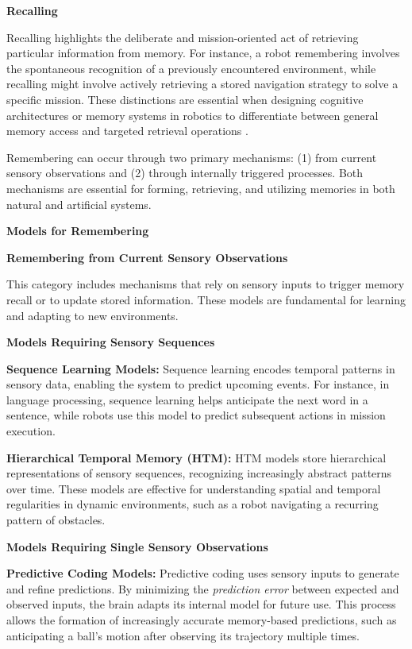 \documentclass{book}
\providecommand{\ProjectDeepHeading}[2]{%
    \par\medskip\noindent\textbf{#2}\par\smallskip
}
\begin{document}
    \ProjectDeepHeading{9}{Recalling}
     Recalling highlights the deliberate and mission-oriented act of retrieving particular information from memory. For instance, a robot remembering involves the spontaneous recognition of a previously encountered environment, while recalling might involve actively retrieving a stored navigation strategy to solve a specific mission. These distinctions are essential when designing cognitive architectures or memory systems in robotics to differentiate between general memory access and targeted retrieval operations .

    Remembering can occur through two primary mechanisms: (1) from current sensory observations and (2) through internally triggered processes. Both mechanisms are essential for forming, retrieving, and utilizing memories in both natural and artificial systems.

\ProjectDeepHeading{6}{Models for Remembering}

    \ProjectDeepHeading{7}{Remembering from Current Sensory Observations}
    This category includes mechanisms that rely on sensory inputs to trigger memory recall or to update stored information. These models are fundamental for learning and adapting to new environments.

        \ProjectDeepHeading{8}{Models Requiring Sensory Sequences}
            \textbf{Sequence Learning Models:} Sequence learning encodes temporal patterns in sensory data, enabling the system to predict upcoming events. For instance, in language processing, sequence learning helps anticipate the next word in a sentence, while robots use this model to predict subsequent actions in mission execution.

            \textbf{Hierarchical Temporal Memory (HTM):} HTM models store hierarchical representations of sensory sequences, recognizing increasingly abstract patterns over time. These models are effective for understanding spatial and temporal regularities in dynamic environments, such as a robot navigating a recurring pattern of obstacles. 

        \ProjectDeepHeading{8}{Models Requiring Single Sensory Observations}
            \textbf{Predictive Coding Models:} Predictive coding uses sensory inputs to generate and refine predictions. By minimizing the \textit{prediction error} between expected and observed inputs, the brain adapts its internal model for future use. This process allows the formation of increasingly accurate memory-based predictions, such as anticipating a ball’s motion after observing its trajectory multiple times. 
\end{document}
